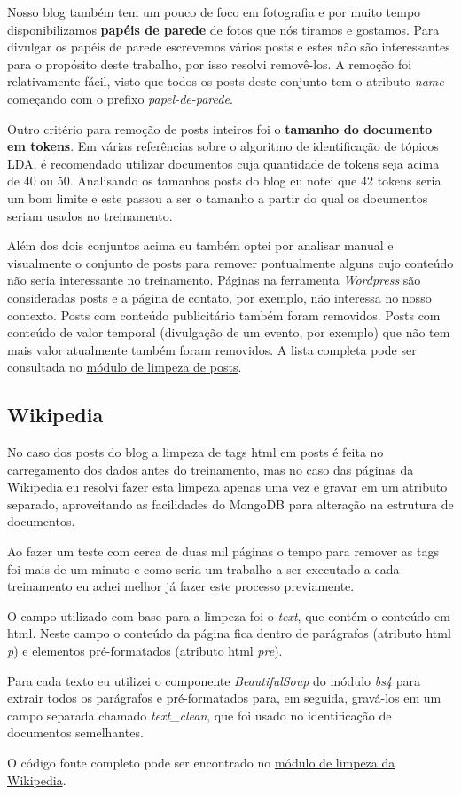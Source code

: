 Nosso blog também tem um pouco de foco em fotografia e por muito tempo disponibilizamos \textbf{papéis de parede} de fotos que nós tiramos e gostamos. 
Para divulgar os papéis de parede escrevemos vários posts e estes não são interessantes para o propósito deste trabalho, por isso resolvi removê-los.
A remoção foi relativamente fácil, visto que todos os posts deste conjunto tem o atributo \textit{name} começando com o prefixo \textit{papel-de-parede}.

Outro critério para remoção de posts inteiros foi o \textbf{tamanho do documento em tokens}. Em várias referências sobre o algoritmo de identificação 
de tópicos LDA, é recomendado utilizar documentos cuja quantidade de tokens seja acima de 40 ou 50. Analisando os tamanhos posts do blog eu notei 
que 42 tokens seria um bom limite e este passou a ser o tamanho a partir do qual os documentos seriam usados no treinamento.

Além dos dois conjuntos acima eu também optei por analisar manual e visualmente o conjunto de posts para remover pontualmente alguns cujo conteúdo 
não seria interessante no treinamento. Páginas na ferramenta \textit{Wordpress} são consideradas posts e a página de contato, por exemplo, 
não interessa no nosso contexto. Posts com conteúdo publicitário também foram removidos. Posts com conteúdo de valor temporal (divulgação de um 
evento, por exemplo) que não tem mais valor atualmente também foram removidos. A lista completa pode ser consultada no 
\href{https://github.com/heldergr/tcc-pucmg-2/blob/main/src/python/notebooks/limpeza/limpeza_posts.py}{módulo de limpeza de posts}.

\subsection{Wikipedia}

No caso dos posts do blog a limpeza de tags html em posts é feita no carregamento dos dados antes do treinamento, mas no caso das páginas da 
Wikipedia eu resolvi fazer esta limpeza apenas uma vez e gravar em um atributo separado, aproveitando as facilidades do MongoDB para alteração 
na estrutura de documentos.

Ao fazer um teste com cerca de duas mil páginas o tempo para remover as tags foi mais de um minuto e como seria um trabalho a ser executado a 
cada treinamento eu achei melhor já fazer este processo previamente.

O campo utilizado com base para a limpeza foi o \textit{text}, que contém o conteúdo em html. Neste campo o conteúdo da página fica dentro de 
parágrafos (atributo html \textit{p}) e elementos pré-formatados (atributo html \textit{pre}).

Para cada texto eu utilizei o componente \textit{BeautifulSoup} do módulo \textit{bs4} para extrair todos os parágrafos e pré-formatados para, 
em seguida, gravá-los em um campo separada chamado \textit{text\_clean}, que foi usado no identificação de documentos semelhantes.

O código fonte completo pode ser encontrado no 
\href{https://github.com/heldergr/tcc-pucmg-2/blob/main/src/python/notebooks/limpeza/limpeza_posts.py}{módulo de limpeza da Wikipedia}.
